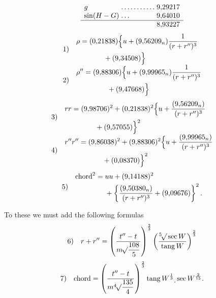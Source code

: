 \[
\begin{array}{l@{\;}l@{\;}r}
g&\mathord{.}\,\mathord{.}\,\mathord{.}\,\mathord{.}\,\mathord{.}\,\mathord{.}\,\mathord{.}\,\mathord{.}\,\mathord{.}\,\mathord{.}\,\mathord{.}&9{,}29217\\
\sin(H-G)&\mathord{.}\,\mathord{.}\,\mathord{.}&9{,}64010\\\hline
&&8{,}93227
\end{array}
\]
\[
\begin{array}{l@{\quad}l}
1)&\begin{aligned}\rho={}&(0{,}21838)\Bigl\{u+(9{,}56209_n)\frac{1}{(r+r'')^3}\\
&\qquad{}+(9{,}34508)\Bigr\}\end{aligned}\\[7pt]
2)&\begin{aligned}\rho''={}&(9{,}88306)\Bigl\{u+(9{,}99965_n)\frac{1}{(r+r'')^3}\\
&\qquad{}+(9{,}47668)\Bigr\}\end{aligned}
\end{array}
\]
\[
\begin{array}{l@{\quad}l}
3)&\begin{aligned}rr={}&(9{,}98706)^2+(0{,}21838)^2\Bigl\{u+\frac{(9{,}56209_n)}{(r+r'')^3}\\
&\qquad{}+(9{,}57055)\Bigr\}^2\end{aligned}\\[7pt]
4)&\begin{aligned}r''r''={}&(9{,}86038)^2+(9{,}88306)^2\Bigl\{u+\frac{(9{,}99965_n)}{(r+r'')^3}\\
&\qquad{}+(0{,}08370)\Bigr\}^2\end{aligned}
\end{array}
\]
\[
\begin{array}{l@{\quad}l}
5)&\begin{aligned}\text{chord}^2={}&uu+(9{,}14188)^2\\
&+\left\{\frac{(9{,}50380_n)}{(r+r'')^3}+(9{,}09676)\right\}^2.
\end{aligned}
\end{array}
\]

To these we must add the following formulas
\[
\begin{array}{l@{\quad}l}
6)&\displaystyle r+r''=\left(\frac{t''-t}{m\BareRoot{\dfrac{108}{5}}}\right)^{\frac{2}{3}}\left(\frac{\BareRoot[5]{\sec W}}{\operatorname{tang}W}\right)^{\frac{2}{3}}
\end{array}
\]
\[
\begin{array}{l@{\quad}l}
7)&\displaystyle\text{chord}=\left(\frac{t''-t}{m\BareRoot[4]{\dfrac{135}{4}}}\right)^{\frac{2}{3}}\operatorname{tang}W^{\frac{1}{3}}\mathord{\raisebox{-.6ex}{.}}\sec W^{\frac{2}{15}}.
\end{array}
\]

